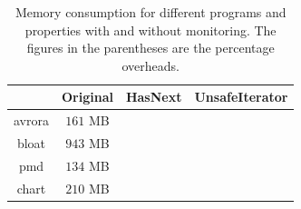 \begin{table}[t]
\centering
\small
\begin{tabular}{|c|c|c|c|}
\hline
 {} & Original & HasNext & UnsafeIterator\\
 \hline
avrora            & $161$ MB      &       &          \\ 
\hline
bloat             & $943$ MB      &     &              \\ 
\hline
pmd               & $134$ MB      &      &              \\ 
\hline
chart & $210$ MB & & \\\hline
\end{tabular}
\caption{Memory consumption for different programs and properties with and 
without monitoring. The figures in the parentheses are the percentage 
overheads. %
}
\end{table}
\label{table:consumedmemory}


